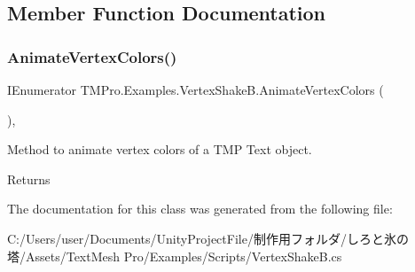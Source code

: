 \subsection{Member Function Documentation}
\mbox{\label{class_t_m_pro_1_1_examples_1_1_vertex_shake_b_a550c38b1fda64b77f736a48470dfb649}} 
\subsubsection{\texorpdfstring{Animate\+Vertex\+Colors()}{AnimateVertexColors()}}
{\footnotesize\ttfamily I\+Enumerator T\+M\+Pro.\+Examples.\+Vertex\+Shake\+B.\+Animate\+Vertex\+Colors (\begin{DoxyParamCaption}{ }\end{DoxyParamCaption})\hspace{0.3cm}{\ttfamily [inline]}, {\ttfamily [private]}}



Method to animate vertex colors of a T\+MP Text object. 

\begin{DoxyReturn}{Returns}

\end{DoxyReturn}


The documentation for this class was generated from the following file\+:\begin{DoxyCompactItemize}
\item 
C\+:/\+Users/user/\+Documents/\+Unity\+Project\+File/制作用フォルダ/しろと氷の塔/\+Assets/\+Text\+Mesh Pro/\+Examples/\+Scripts/Vertex\+Shake\+B.\+cs\end{DoxyCompactItemize}

